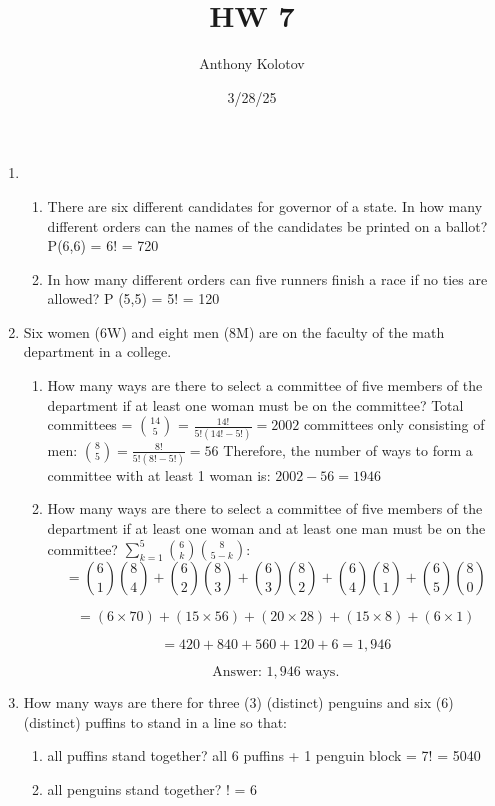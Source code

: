 \documentclass{article}
\title{HW 7}
\date{3/28/25}
\author{Anthony Kolotov}
\begin{document}
	\maketitle
	

	\begin{enumerate}
		\item 
		\begin{enumerate}
			\item There are six different candidates for governor of a state. In how many different orders can the names of the candidates be printed on a ballot?
			\subitem P(6,6) = 6! = 720
			\item In how many different orders can five runners finish a race if no ties are allowed?
			\subitem P (5,5) = 5! = 120
		\end{enumerate}
		
		\item Six women (6W) and eight men (8M) are on the faculty of the math department in a college.
		\begin{enumerate}
			\item How many ways are there to select a committee of five members of the department if at least one woman must be on the committee?
			\subitem Total committees = $\binom{14}{5}$ = $\frac{14!}{5!(14!-5!)} = 2002$
			\subitem committees only consisting of men: $\binom{8}{5} = \frac{8!}{5!(8!-5!)} = 56$ 
			\subitem Therefore, the number of ways to form a committee with at least 1 woman is: $2002 - 56 = 1946$
			\item How many ways are there to select a committee of five members of the department if at least one woman and at least one man must be on the committee?
			\subitem $\sum_{k=1}^{5} \binom{6}{k} \binom{8}{5-k}$:
			\subitem \[
			= \binom{6}{1} \binom{8}{4} + \binom{6}{2} \binom{8}{3} + \binom{6}{3} \binom{8}{2} + \binom{6}{4} \binom{8}{1} + \binom{6}{5} \binom{8}{0}
			\]
			
			\[
			= (6 \times 70) + (15 \times 56) + (20 \times 28) + (15 \times 8) + (6 \times 1)
			\]
			
			\[
			= 420 + 840 + 560 + 120 + 6 = 1,946
			\]
			
			\[
			\text{Answer: } 1,946 \text{ ways.}
			\]
			
		\end{enumerate}
		
		\item How many ways are there for three (3) (distinct) penguins and six (6) (distinct) puffins to stand in a line so that:
		\begin{enumerate}
			\item all puffins stand together?
			\subitem all 6 puffins + 1 penguin block = 7! = 5040
			\item all penguins stand together?
			! = 6
			

\end{enumerate}
\end{enumerate}
\end{document}
